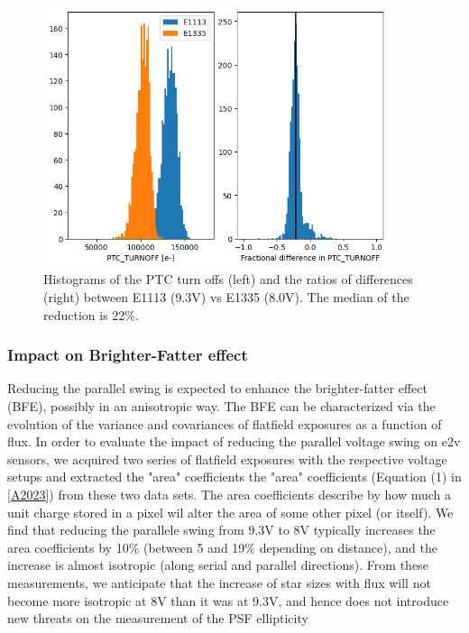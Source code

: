 \begin{figure}
\begin{centering}
\includegraphics[width=0.9\textwidth]{sections/figures/PtcTurnoffRatio.png}
\end{centering}
\caption{Histograms of the PTC turn offs (left) and the ratios of
differences (right) between E1113 (9.3V) vs E1335 (8.0V). The median of
the reduction is 22\%.}
\end{figure}

\subsubsection{Impact on Brighter-Fatter
effect}\label{impact-on-brighter-fatter-effect}

Reducing the parallel swing is expected to enhance the brighter-fatter
effect (BFE), possibly in an anisotropic way. The BFE can be
characterized via the evolution of the variance and covariances of
flatfield exposures as a function of flux. In order to evaluate the
impact of reducing the parallel voltage swing on e2v sensors, we
acquired two series of flatfield exposures with the respective voltage
setups and extracted the "area" coefficients the "area" coefficients
(Equation (1) in \hyperref[A2023]{{[}A2023{]}}) from these two data
sets. The area coefficients describe by how much a unit charge stored in
a pixel wil alter the area of some other pixel (or itself). We find that
reducing the parallele swing from 9.3V to 8V typically increases the
area coefficients by 10\% (between 5 and 19\% depending on distance),
and the increase is almost isotropic (along serial and parallel
directions). From these measurements, we anticipate that the increase of
star sizes with flux will not become more isotropic at 8V than it was at
9.3V, and hence does not introduce new threats on the measurement of the
PSF ellipticity


